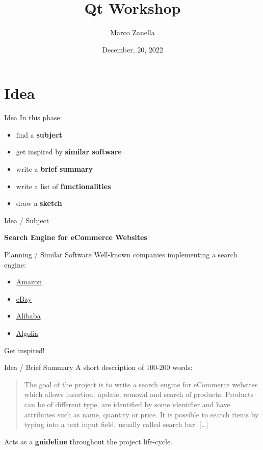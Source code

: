 \documentclass[11pt]{beamer}
\author{Marco Zanella}
\title{Qt Workshop}
\institute{University of Padova}
\date{December, 20, 2022}
\renewcommand{\emph}[1]{\textbf{#1}}
\begin{document}
\begin{frame}
 \titlepage
\end{frame}

\begin{frame}
 \tableofcontents
\end{frame}


\section{Idea}
\begin{frame}{Idea}
 In this phase:
 \begin{itemize}
  \item find a \emph{subject}
  \item get inspired by \emph{similar software}
  \item write a \emph{brief summary}
  \item write a list of \emph{functionalities}
  \item draw a \emph{sketch}
 \end{itemize}
\end{frame}


\begin{frame}{Idea / Subject}
 \begin{center}
  \emph{Search Engine for eCommerce Websites}
 \end{center}
\end{frame}


\begin{frame}{Planning / Similar Software}
 Well-known companies implementing a search engine:
 \begin{itemize}
   \item \href{https://www.amazon.com}{Amazon}
   \item \href{https://www.ebay.com}{eBay}
   \item \href{https://www.alibaba.com}{Alibaba}
   \item \href{https://www.algolia.com}{Algolia}
 \end{itemize}
 Get inspired!
\end{frame}


\begin{frame}{Idea / Brief Summary}
 A short description of 100-200 words:
 
 \begin{quote}
  The goal of the project is to write a search engine for eCommerce websites which allows insertion, update, removal and search of products. Products can be of different type, are identified by some identifier and have attributes such as name, quantity or price. It is possible to search items by typing into a text input field, usually called search bar. [\ldots]
 \end{quote}
 
 Acts as a \emph{guideline} throughout the project life-cycle.
\end{frame}
\end{document}
